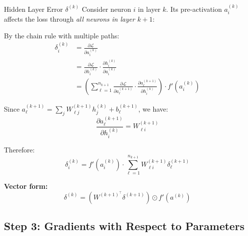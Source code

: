 \begin{derivation}{Hidden Layer Error $\delta^{(k)}$}
Consider neuron $i$ in layer $k$. Its pre-activation $a_i^{(k)}$ affects the loss through \emph{all neurons in layer $k+1$}:

\begin{center}
\end{center}

By the chain rule with multiple paths:
\begin{align}
\delta_i^{(k)} &= \frac{\partial \mathcal{L}}{\partial a_i^{(k)}} \\
&= \frac{\partial \mathcal{L}}{\partial h_i^{(k)}} \cdot \frac{\partial h_i^{(k)}}{\partial a_i^{(k)}} \\
&= \left( \sum_{\ell=1}^{n_{k+1}} \frac{\partial \mathcal{L}}{\partial a_\ell^{(k+1)}} \cdot \frac{\partial a_\ell^{(k+1)}}{\partial h_i^{(k)}} \right) \cdot f'(a_i^{(k)})
\end{align}

Since $a_\ell^{(k+1)} = \sum_j W_{\ell j}^{(k+1)} h_j^{(k)} + b_\ell^{(k+1)}$, we have:
\[
\frac{\partial a_\ell^{(k+1)}}{\partial h_i^{(k)}} = W_{\ell i}^{(k+1)}
\]

Therefore:
\[
\boxed{\delta_i^{(k)} = f'(a_i^{(k)}) \cdot \sum_{\ell=1}^{n_{k+1}} W_{\ell i}^{(k+1)} \delta_\ell^{(k+1)}}
\]

\textbf{Vector form:}
\[
\boxed{\delta^{(k)} = \left( W^{(k+1)^\top} \delta^{(k+1)} \right) \odot f'(a^{(k)})}
\]
\end{derivation}

\subsection{Step 3: Gradients with Respect to Parameters}

